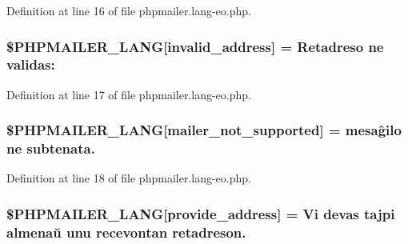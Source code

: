 Definition at line 16 of file phpmailer.\+lang-\/eo.\+php.

\subsubsection[{\texorpdfstring{\$\+P\+H\+P\+M\+A\+I\+L\+E\+R\+\_\+\+L\+A\+NG}{$PHPMAILER_LANG}}]{\setlength{\rightskip}{0pt plus 5cm}\$P\+H\+P\+M\+A\+I\+L\+E\+R\+\_\+\+L\+A\+NG\mbox{[}\textquotesingle{}invalid\+\_\+address\textquotesingle{}\mbox{]} = \textquotesingle{}Retadreso ne validas\+: \textquotesingle{}}\hypertarget{phpmailer_8lang-eo_8php_a42d61bcea4c79599ecb44fd062f54d47}{}\label{phpmailer_8lang-eo_8php_a42d61bcea4c79599ecb44fd062f54d47}


Definition at line 17 of file phpmailer.\+lang-\/eo.\+php.

\subsubsection[{\texorpdfstring{\$\+P\+H\+P\+M\+A\+I\+L\+E\+R\+\_\+\+L\+A\+NG}{$PHPMAILER_LANG}}]{\setlength{\rightskip}{0pt plus 5cm}\$P\+H\+P\+M\+A\+I\+L\+E\+R\+\_\+\+L\+A\+NG\mbox{[}\textquotesingle{}mailer\+\_\+not\+\_\+supported\textquotesingle{}\mbox{]} = \textquotesingle{} mesaĝilo ne subtenata.\textquotesingle{}}\hypertarget{phpmailer_8lang-eo_8php_aa2ebcb8833ee83a7ad67401c4bb3a6ad}{}\label{phpmailer_8lang-eo_8php_aa2ebcb8833ee83a7ad67401c4bb3a6ad}


Definition at line 18 of file phpmailer.\+lang-\/eo.\+php.

\subsubsection[{\texorpdfstring{\$\+P\+H\+P\+M\+A\+I\+L\+E\+R\+\_\+\+L\+A\+NG}{$PHPMAILER_LANG}}]{\setlength{\rightskip}{0pt plus 5cm}\$P\+H\+P\+M\+A\+I\+L\+E\+R\+\_\+\+L\+A\+NG\mbox{[}\textquotesingle{}provide\+\_\+address\textquotesingle{}\mbox{]} = \textquotesingle{}Vi devas tajpi almenaŭ unu recevontan retadreson.\textquotesingle{}}\hypertarget{phpmailer_8lang-eo_8php_a8b97897c2406b7392b056f375feeefbb}{}\label{phpmailer_8lang-eo_8php_a8b97897c2406b7392b056f375feeefbb}


